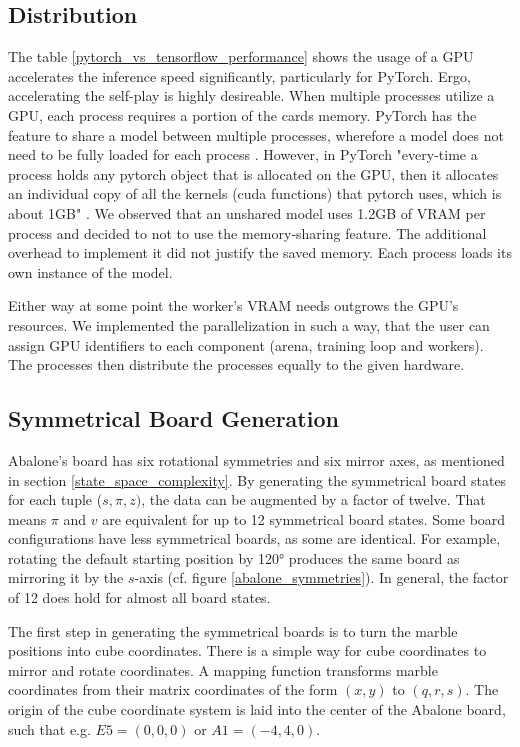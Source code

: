 \subsection{Distribution}
The table \ref{pytorch_vs_tensorflow_performance} shows the usage of a GPU accelerates the inference speed significantly, particularly for PyTorch. Ergo, accelerating the self-play is highly desireable. When multiple processes utilize a GPU, each process requires a portion of the cards memory. PyTorch has the feature to share a model between multiple processes, wherefore a model does not need to be fully loaded for each process \cite{noauthor_module_nodate}. However, in PyTorch "every-time a process holds any pytorch object that is allocated on the GPU, then it allocates an individual copy of all the kernels (cuda functions) that pytorch uses, which is about 1GB" \cite{radim_shark_sharing_2020}. We observed that an unshared model uses 1.2GB of VRAM per process and decided to not to use the memory-sharing feature. The additional overhead to implement it did not justify the saved memory. Each process loads its own instance of the model.

Either way at some point the worker's VRAM needs outgrows the GPU's resources. We implemented the parallelization in such a way, that the user can assign GPU identifiers to each component (arena, training loop and workers). The processes then distribute the processes equally to the given hardware.

\subsection{Symmetrical Board Generation}
Abalone's board has six rotational symmetries and six mirror axes, as mentioned in section \ref{state_space_complexity}. By generating the symmetrical board states for each tuple ($s, \pi, z)$, the data can be augmented by a factor of twelve. That means $\pi$ and $v$ are equivalent for up to 12 symmetrical board states. Some board configurations have less symmetrical boards, as some are identical. For example, rotating the default starting position by 120° produces the same board as mirroring it by the $s$-axis (cf. figure \ref{abalone_symmetries}). In general, the factor of 12 does hold for almost all board states.

The first step in generating the symmetrical boards is to turn the marble positions into cube coordinates. There is a simple way for cube coordinates to mirror and rotate coordinates. A mapping function transforms marble coordinates from their matrix coordinates of the form $(x, y)$ to $(q, r, s)$. The origin of the cube coordinate system is laid into the center of the Abalone board, such that e.g. $E5 = (0, 0, 0)$ or $A1 = (-4, 4, 0)$.

